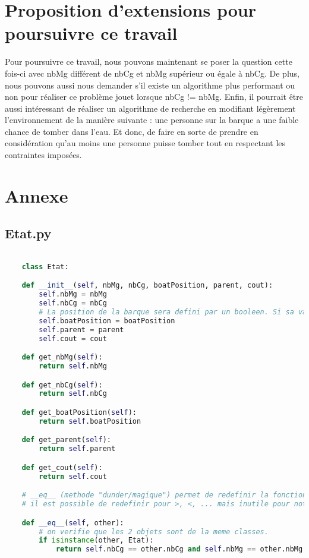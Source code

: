 \documentclass[a4paper, 12pt, french,oneside]{book}
\begin{document}
\chapter{Proposition d'extensions pour poursuivre ce travail}
Pour poursuivre ce travail, nous pouvons maintenant se poser la question cette fois-ci avec nbMg différent de nbCg et nbMg supérieur ou égale à nbCg. De plus, nous pouvons aussi nous demander s'il existe un algorithme plus performant ou non pour réaliser ce problème jouet lorsque nbCg != nbMg.
Enfin, il pourrait être aussi intéressant de réaliser un algorithme de recherche en modifiant légèrement l'environnement de la manière suivante : une personne sur la barque a une faible chance de tomber dans l'eau. Et donc, de faire en sorte de prendre en considération qu'au moins une personne puisse tomber tout en respectant les contraintes imposées.

\appendix
\chapter{Annexe}
\section{Etat.py}
\begin{lstlisting}[language=Python, caption=Python example] 

    class Etat:

    def __init__(self, nbMg, nbCg, boatPosition, parent, cout):
        self.nbMg = nbMg
        self.nbCg = nbCg
        # La position de la barque sera defini par un booleen. Si sa valeur est egale a vraie alors la barque est a guache sinon elle est a droite
        self.boatPosition = boatPosition
        self.parent = parent
        self.cout = cout

    def get_nbMg(self):
        return self.nbMg

    def get_nbCg(self):
        return self.nbCg

    def get_boatPosition(self):
        return self.boatPosition

    def get_parent(self):
        return self.parent

    def get_cout(self):
        return self.cout

    # __eq__ (methode "dunder/magique") permet de redefinir la fonction ==. Cela nous sera utile pour verifie si 2 etats sont egaux. (fonctionne avec .remove() pour la comparaison d'etat)
    # il est possible de redefinir pour >, <, ... mais inutile pour notre cas.

    def __eq__(self, other):
        # on verifie que les 2 objets sont de la meme classes.
        if isinstance(other, Etat):
            return self.nbCg == other.nbCg and self.nbMg == other.nbMg and self.boatPosition == other.boatPosition
\end{lstlisting}
\end{document}
